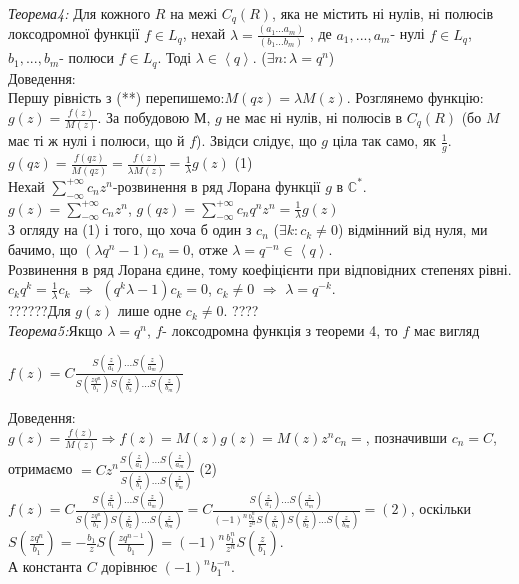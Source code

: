 \documentclass[12pt,a4paper]{article}
\begin{document}
\emph{Теорема4:} Для кожного $R$ на межі $C_{q}(R)$, яка не містить ні нулів, ні полюсів локсодромної функції $f\in L_{q}$, нехай $\lambda=\frac{(a_{1}...a_{m})}{(b_{1}...b_{m})}$ , де $a_{1},...,a_{m}$- нулі $f\in L_{q}$, $b_{1},...,b_{m}$- полюси $f\in L_{q}$. Тоді $\lambda\in \left \langle q \right \rangle$. ($ \exists n:\lambda =q^{n}$)\\
Доведення:\\
Першу рівність з (**) перепишемо:$ M(qz)=\lambda M(z)$. Розглянемо функцію:$ g(z)=\frac{f(z)}{M(z)}$. За побудовою $М$, $g$ не має ні нулів, ні полюсів в $C_{q}(R)$ (бо $M$ має ті ж нулі і полюси, що й $f$). Звідси слідує, що $g$ ціла так само, як $\frac{1}{g}$.\\
$g(qz)=\frac{f(qz)}{M(qz)}=\frac{f(z)}{\lambda M(z)}=\frac{1}{\lambda}g(z)$ (1)\\
Нехай $\sum_{-\infty}^{+\infty}c_{n}z^{n}$-розвинення в ряд Лорана функції $g$ в $\mathbb{C}^{*}$.\\
$g(z)=\sum_{-\infty}^{+\infty}c_{n}z^{n}$, $g(qz)=\sum_{-\infty}^{+\infty}c_{n}q^{n}z^{n}=\frac{1}{\lambda}g(z)$\\
З огляду на (1) і того, що хоча б один з $c_{n}$ ($\exists k: c_{k}\neq 0$) відмінний від нуля, ми бачимо, що $(\lambda q^{n}-1)c_{n}=0$, отже $\lambda= q^{-n}\in \left \langle q \right \rangle $.\\
Розвинення в ряд Лорана єдине, тому коефіцієнти при відповідних степенях рівні.
$c_{k}q^{k}=\frac{1}{\lambda} c_{k}$ $\Rightarrow$ $(q^{k}\lambda -1)c_{k}=0$, $c_{k}\neq 0$ $\Rightarrow$  $\lambda=q^{-k}$.\\
??????Для $g(z)$ лише одне $ c_{k}\neq 0$. ????\\

\emph{Теорема5:}Якщо $\lambda =q^{n}$, $f$- локсодромна функція з теореми 4, то  $f$ має вигляд\\
 \begin{center}
 $f(z)= C\tfrac{S(\frac{z}{a_{1}})...S(\frac{z}{a_{m}})}{S(\frac{zq^{n}}{b_{1}})S(\frac{z}{b_{2}})...S(\frac{z}{b_{m}})}$
 \end{center}
Доведення:\\
$g(z)=\frac{f(z)}{M(z)}\Rightarrow f(z)=M(z)g(z)= M(z)z^{n}c_{n}=$, позначивши $c_{n}=C$, отримаємо $=Cz^{n}\frac{S(\frac{z}{a_{1}})...S(\frac{z}{a_{m}})}{S(\frac{z}{b_{1}})...S(\frac{z}{b_{m}})}$ (2)\\
$f(z)=C\tfrac{S(\frac{z}{a_{1}})...S(\frac{z}{a_{m}})}{S(\frac{zq^{n}}{b_{1}})S(\frac{z}{b_{2}})...S(\frac{z}{b_{m}})}= C\tfrac{S(\frac{z}{a_{1}})...S(\frac{z}{a_{m}})}{(-1)^{n}\frac{b_{1}^{n}}{z^{n}} S(\frac{z}{b_{1}})S(\frac{z}{b_{2}})...S(\frac{z}{b_{m}})}=(2)$, оскільки\\
$S(\frac{zq^{n}}{b_{1}})= -\frac{b_{1}}{z}S(\frac{zq^{n-1}}{b_{1}})=(-1)^{n}\frac{b_{1}^{n}}{z^{n}}S(\frac{z}{b_{1}})$.\\
А константа $C$ дорівнює $(-1)^{n}b_{1}^{-n}$.\\
\end{document}
